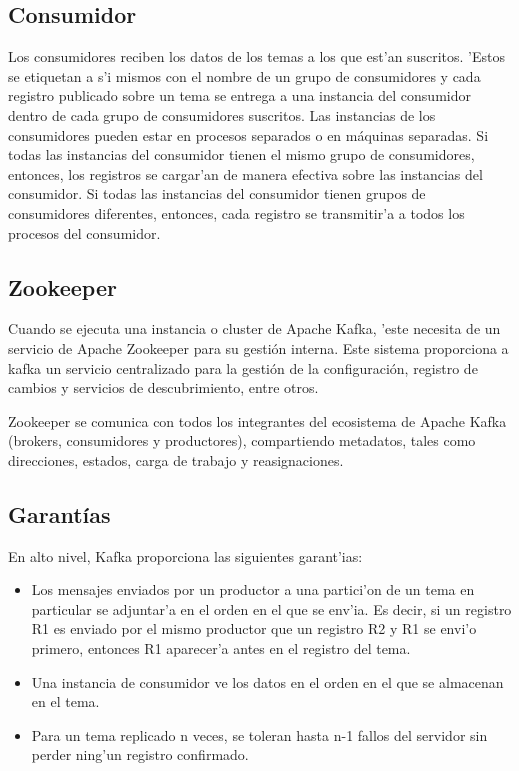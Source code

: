 \subsection{Consumidor}
Los consumidores reciben los datos de los temas a los que est'an suscritos. 'Estos se etiquetan a s'i mismos con el nombre de un grupo de consumidores y cada registro publicado sobre un tema se entrega a una instancia del consumidor dentro de cada grupo de consumidores suscritos. Las instancias de los consumidores pueden estar en procesos separados o en máquinas separadas.
Si todas las instancias del consumidor tienen el mismo grupo de consumidores, entonces, los registros se cargar'an de manera efectiva sobre las instancias del consumidor.
Si todas las instancias del consumidor tienen grupos de consumidores diferentes, entonces, cada registro se transmitir'a a todos los procesos del consumidor.

\subsection{Zookeeper}
Cuando se ejecuta una instancia o cluster de Apache Kafka, 'este necesita de un servicio de Apache Zookeeper para su gestión interna. Este sistema proporciona a kafka un servicio centralizado para la gestión de la configuración, registro de cambios y servicios de descubrimiento, entre otros. 

Zookeeper se comunica con todos los integrantes del ecosistema de Apache Kafka (brokers, consumidores y productores), compartiendo metadatos, tales como direcciones, estados, carga de trabajo y reasignaciones.

\subsection{Garantías}
En alto nivel, Kafka proporciona las siguientes garant'ias:
\begin{itemize}
\item Los mensajes enviados por un productor a una partici'on de un tema en particular se adjuntar'a en el orden en el que se env'ia. Es decir, si un registro R1 es enviado por el mismo productor que un registro R2 y R1 se envi'o primero, entonces R1 aparecer'a antes en el registro del tema.
\item Una instancia de consumidor ve los datos en el orden en el que se almacenan en el tema.
\item Para un tema replicado n veces, se toleran hasta n-1 fallos del servidor sin perder ning'un registro confirmado.
\end{itemize}


\clearpage